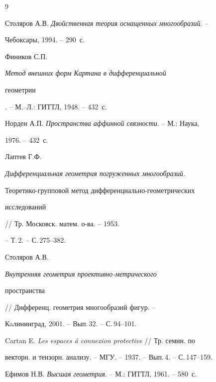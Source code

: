\begin{thebibliography}{9} 


 




Столяров А.В. {\em Двойственная теория оснащенных многообразий}. -- 


Чебоксары, 1994. -- 290~с. 




Фиников С.П. {\em Метод внешних форм Картана в дифференциальной 


геометрии}. -- М.--Л.: ГИТТЛ, 1948. -- 432~с. 




Норден А.П. {\em Пространства аффинной связности}. -- М.: Наука, 


1976. -- 432~с. 




Лаптев Г.Ф. {\em Дифференциальная геометрия погруженных многообразий. 


Теоретико-групповой метод дифференциально-геометрических 


исследований} // Тр. Московск. матем. о-ва. -- 1953. 


-- Т.\,2. -- С.\,275--382. 




Столяров А.В. {\em Внутренняя геометрия проективно-метрического 


пространства} // Дифференц. геометрия многообразий фигур. -- 


Кaлининград, 2001. -- Вып.\,32. -- С.\,94--101. 




Cartan E. {\em Les espaces \'a connexion protective} // Тр. семин. по 


векторн. и тензорн. анализу. -- МГУ. -- 1937. -- Вып.\,4. -- С.\,147--159. 


 




Ефимов Н.В. {\em Высшая геометрия}. -- М.: ГИТТЛ, 1961. -- 580~с. 


 


\end{thebibliography} 


 


\vskip 2cm 


 








 


\label{end} 


 


